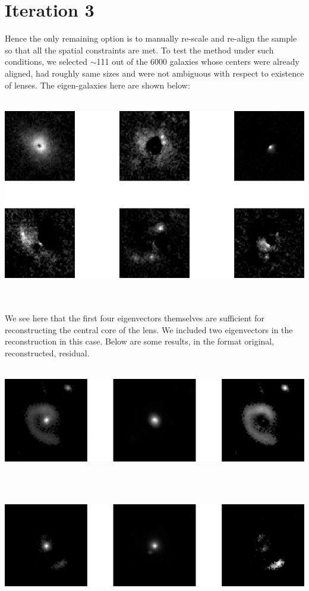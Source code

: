 \documentclass[11pt, a4paper]{article}
\begin{document}
\section{Iteration 3}
Hence the only remaining option is to manually re-scale and re-align the sample so that all the spatial constraints are met. To test the method under such conditions, we selected $\sim$111 out of the 6000 galaxies whose centers were already aligned, had roughly same sizes and were not ambiguous with respect to existence of lenses. The eigen-galaxies here are shown below:\\ \\
\centerline{\includegraphics[scale=0.5]{limited_subset_basis.png}} \\ \\
We see here that the first four eigenvectors themselves are sufficient for reconstructing the central core of the lens. We included two eigenvectors in the reconstruction in this case. Below are some results, in the format original, reconstructed, residual.\\ \\
\centerline{\includegraphics[scale=0.5]{4339_Final_Source_Subtraction.png}} \\ \\
\centerline{\includegraphics[scale=0.5]{704_Final_Source_Subtraction.png}} \\ \\
\end{document}

